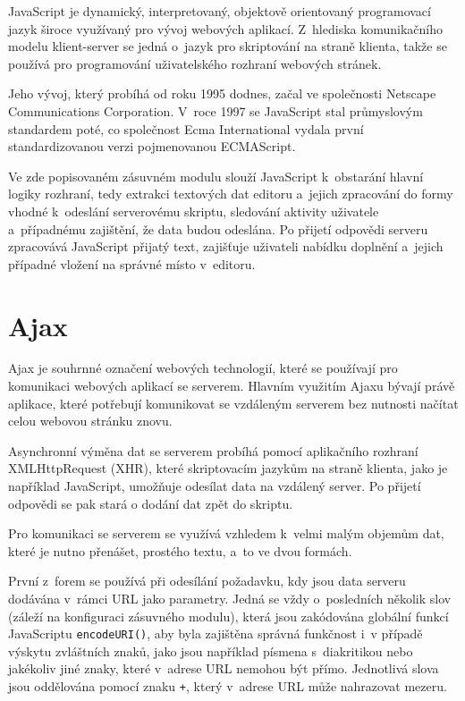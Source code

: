 \documentclass[a4paper,11pt,openany]{book} %
\begin{document}
JavaScript je dynamický, interpretovaný, objektově orientovaný programovací jazyk široce využívaný pro vývoj webových aplikací. Z~hlediska komunikačního modelu klient-server se jedná o~jazyk pro skriptování na straně klienta, takže se používá pro programování uživatelského rozhraní webových stránek. \parencite[2--4]{flanagan2006javascript} %


Jeho vývoj, který probíhá od roku 1995 dodnes, začal ve společnosti Netscape Communications Corporation. V~roce 1997 se JavaScript stal průmyslovým standardem poté, co společnost Ecma International vydala první standardizovanou verzi pojmenovanou ECMAScript. \parencite{brendaneich2011} %

Ve zde popisovaném zásuvném modulu slouží JavaScript k~obstarání hlavní logiky rozhraní, tedy extrakci textových dat editoru a~jejich zpracování do formy vhodné k~odeslání serverovému skriptu, sledování aktivity uživatele a~případnému zajištění, že data budou odeslána. Po přijetí odpovědi serveru zpracovává JavaScript přijatý text, zajišťuje uživateli nabídku doplnění a~jejich případné vložení na správné místo v~editoru. 

\section{Ajax}

Ajax je souhrnné označení webových technologií, které se používají pro komunikaci webových aplikací se serverem. Hlavním využitím Ajaxu bývají právě aplikace, které potřebují komunikovat se vzdáleným serverem bez nutnosti načítat celou webovou stránku znovu. \parencite{garrett2005ajax}

Asynchronní výměna dat se serverem probíhá pomocí aplikačního rozhraní XMLHttpRequest (XHR), které skriptovacím jazykům na straně klienta, jako je například JavaScript, umožňuje odesílat data na vzdálený server. Po přijetí odpovědi se pak stará o dodání dat zpět do skriptu.

Pro komunikaci se serverem se využívá vzhledem k~velmi malým objemům dat, které je nutno přenášet, prostého textu, a~to ve dvou formách. 

První z~forem se používá při odesílání požadavku, kdy jsou data serveru dodávána v~rámci URL jako parametry. Jedná se vždy o~posledních několik slov (záleží na konfiguraci zásuvného modulu), která jsou zakódována globální funkcí JavaScriptu {\tt encodeURI()}, aby byla zajištěna správná funkčnost i~v případě výskytu zvláštních znaků, jako jsou například písmena s~diakritikou nebo jakékoliv jiné znaky, které v~adrese URL nemohou být přímo. Jednotlivá slova jsou oddělována pomocí znaku {\tt +}, který v~adrese URL může nahrazovat mezeru.
\end{document}
